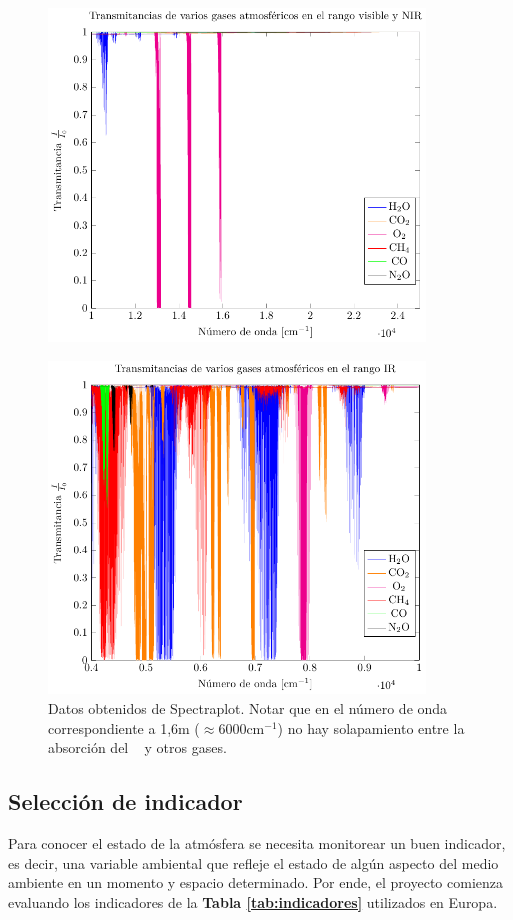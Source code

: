 \documentclass[11pt,titlepage]{article}
\begin{document}
\begin{figure}[htb!]
    \centering
    \includegraphics[width=10cm]{pdf/transmitanciaVisibleNIR.pdf}
\end{figure}
\begin{figure}[htb!]
    \centering
    \includegraphics[width=10cm]{pdf/transmitanciaIR.pdf}
    \caption{Datos obtenidos de Spectraplot. Notar que en el número de onda correspondiente a 1,6\micro m 
    ($\approx 6000$cm$^{-1}$) no hay solapamiento entre la absorción del \metano~ y otros gases.}
\end{figure}

\subsection{Selección de indicador}

Para conocer el estado de la atmósfera se necesita monitorear un buen indicador, es decir, una variable ambiental que refleje el estado de algún aspecto del medio ambiente en un momento y espacio determinado. Por ende, el proyecto comienza evaluando los indicadores de la \textbf{Tabla \ref{tab:indicadores}} utilizados en Europa.\par
\end{document}
